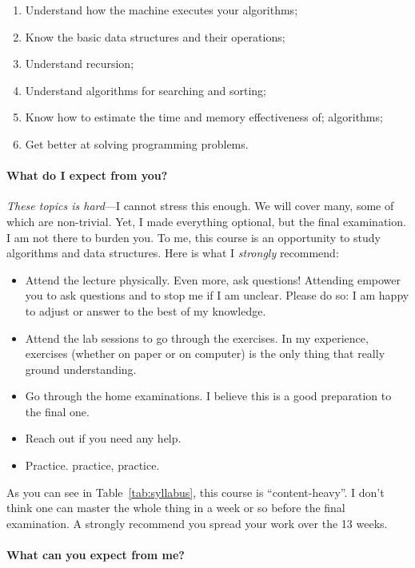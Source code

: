 \documentclass{aldast}
\begin{document}
\begin{enumerate}
  \item Understand how the machine executes your algorithms;
  \item Know the basic data structures and their operations;
  \item Understand recursion;
  \item Understand algorithms for searching and sorting;
  \item Know how to estimate the time and memory effectiveness of;
    algorithms;
  \item Get better at solving programming problems.
\end{enumerate}

\paragraph{What do I expect from you?}

\emph{These topics is hard}---I cannot stress this enough. We will
cover many, some of which are non-trivial. Yet, I made everything
optional, but the final examination. I am not there to burden
you. To me, this course is an opportunity to study algorithms and data
structures. Here is what I \emph{strongly} recommend:

\begin{itemize}
\item Attend the lecture physically. Even more, ask questions!
  Attending empower you to ask questions and to stop me if I am
  unclear. Please do so: I am happy to adjust or answer to the best of
  my knowledge.
\item Attend the lab sessions to go through the exercises. In my
  experience, exercises (whether on paper or on computer) is the only
  thing that really ground understanding.
\item Go through the home examinations. I believe this is a good
  preparation to the final one.
\item Reach out if you need any help.
\item Practice. practice, practice.
\end{itemize}

As you can see in Table~\ref{tab:syllabus}, this course is
``content-heavy''. I don't think one can master the whole thing in a
week or so before the final examination. A strongly recommend you
spread your work over the 13 weeks.

\paragraph {What can you expect from me?}
\end{document}
